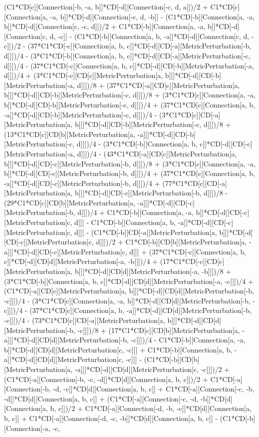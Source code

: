 (C1*CD[c][Connection[-b, -a, b]]*CD[-d][Connection[-c, d, a]])/2 + C1*CD[c][Connection[a, -a, b]]*CD[-d][Connection[-c, d, -b]] - (C1*CD[-b][Connection[a, -a, b]]*CD[-d][Connection[c, -c, d]])/2 + C1*CD[-b][Connection[a, -a, b]]*CD[-d][Connection[c, d, -c]] - (C1*CD[-b][Connection[a, b, -a]]*CD[-d][Connection[c, d, -c]])/2 - (37*C1*CD[-c][Connection[a, b, c]]*CD[-d][CD[-a][MetricPerturbation[-b, d]]])/4 - (3*C1*CD[-b][Connection[a, b, c]]*CD[-d][CD[-a][MetricPerturbation[-c, d]]])/4 - (37*C1*CD[-c][Connection[a, b, c]]*CD[-d][CD[-b][MetricPerturbation[-a, d]]])/4 + (3*C1*CD[-c][CD[c][MetricPerturbation[a, b]]]*CD[-d][CD[-b][MetricPerturbation[-a, d]]])/8 + (37*C1*CD[-a][CD[c][MetricPerturbation[a, b]]]*CD[-d][CD[-b][MetricPerturbation[-c, d]]])/8 + (3*C1*CD[c][Connection[a, -a, b]]*CD[-d][CD[-b][MetricPerturbation[-c, d]]])/4 + (37*C1*CD[c][Connection[a, b, -a]]*CD[-d][CD[-b][MetricPerturbation[-c, d]]])/4 - (3*C1*CD[c][CD[-a][MetricPerturbation[a, b]]]*CD[-d][CD[-b][MetricPerturbation[-c, d]]])/8 + (13*C1*CD[c][CD[b][MetricPerturbation[a, -a]]]*CD[-d][CD[-b][MetricPerturbation[-c, d]]])/4 - (3*C1*CD[-b][Connection[a, b, c]]*CD[-d][CD[-c][MetricPerturbation[-a, d]]])/4 - (43*C1*CD[-a][CD[c][MetricPerturbation[a, b]]]*CD[-d][CD[-c][MetricPerturbation[-b, d]]])/8 + (3*C1*CD[c][Connection[a, -a, b]]*CD[-d][CD[-c][MetricPerturbation[-b, d]]])/4 + (37*C1*CD[c][Connection[a, b, -a]]*CD[-d][CD[-c][MetricPerturbation[-b, d]]])/4 + (77*C1*CD[c][CD[-a][MetricPerturbation[a, b]]]*CD[-d][CD[-c][MetricPerturbation[-b, d]]])/8 - (29*C1*CD[c][CD[b][MetricPerturbation[a, -a]]]*CD[-d][CD[-c][MetricPerturbation[-b, d]]])/4 + C1*CD[-b][Connection[a, -a, b]]*CD[-d][CD[-c][MetricPerturbation[c, d]]] - C1*CD[-b][Connection[a, b, -a]]*CD[-d][CD[-c][MetricPerturbation[c, d]]] - (C1*CD[-b][CD[-a][MetricPerturbation[a, b]]]*CD[-d][CD[-c][MetricPerturbation[c, d]]])/2 + C1*CD[-b][CD[b][MetricPerturbation[a, -a]]]*CD[-d][CD[-c][MetricPerturbation[c, d]]] + (37*C1*CD[-c][Connection[a, b, c]]*CD[-d][CD[d][MetricPerturbation[-a, -b]]])/4 + (17*C1*CD[-c][CD[c][MetricPerturbation[a, b]]]*CD[-d][CD[d][MetricPerturbation[-a, -b]]])/8 + (3*C1*CD[-b][Connection[a, b, c]]*CD[-d][CD[d][MetricPerturbation[-a, -c]]])/4 + (C1*CD[-a][CD[c][MetricPerturbation[a, b]]]*CD[-d][CD[d][MetricPerturbation[-b, -c]]])/4 - (3*C1*CD[c][Connection[a, -a, b]]*CD[-d][CD[d][MetricPerturbation[-b, -c]]])/4 - (37*C1*CD[c][Connection[a, b, -a]]*CD[-d][CD[d][MetricPerturbation[-b, -c]]])/4 - (73*C1*CD[c][CD[-a][MetricPerturbation[a, b]]]*CD[-d][CD[d][MetricPerturbation[-b, -c]]])/8 + (17*C1*CD[c][CD[b][MetricPerturbation[a, -a]]]*CD[-d][CD[d][MetricPerturbation[-b, -c]]])/4 - C1*CD[-b][Connection[a, -a, b]]*CD[-d][CD[d][MetricPerturbation[c, -c]]] + C1*CD[-b][Connection[a, b, -a]]*CD[-d][CD[d][MetricPerturbation[c, -c]]] - (C1*CD[-b][CD[b][MetricPerturbation[a, -a]]]*CD[-d][CD[d][MetricPerturbation[c, -c]]])/2 + (C1*CD[-a][Connection[-b, -c, -d]]*CD[d][Connection[a, b, c]])/2 + C1*CD[-a][Connection[-b, -d, -c]]*CD[d][Connection[a, b, c]] + C1*CD[-a][Connection[-c, -b, -d]]*CD[d][Connection[a, b, c]] + (C1*CD[-a][Connection[-c, -d, -b]]*CD[d][Connection[a, b, c]])/2 + C1*CD[-a][Connection[-d, -b, -c]]*CD[d][Connection[a, b, c]] + C1*CD[-a][Connection[-d, -c, -b]]*CD[d][Connection[a, b, c]] - (C1*CD[-b][Connection[-a, -c, 